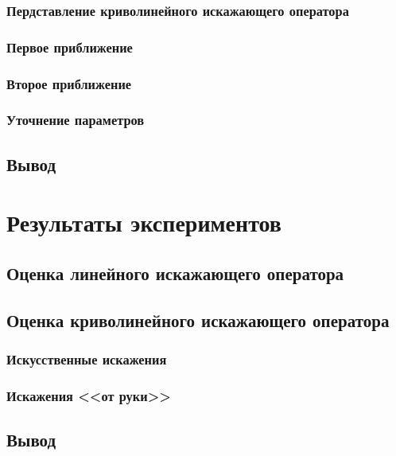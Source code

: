 \subsection{Пердставление криволинейного искажающего оператора}
\subsection{Первое приближение}
\subsection{Второе приближение}
\subsection{Уточнение параметров}
\section{Вывод}



\chapter{Результаты экспериментов}
\section{Оценка линейного искажающего оператора}
\section{Оценка криволинейного искажающего оператора}
\subsection{Искусственные искажения}
\subsection{Искажения <<от руки>>}
\section{Вывод}
